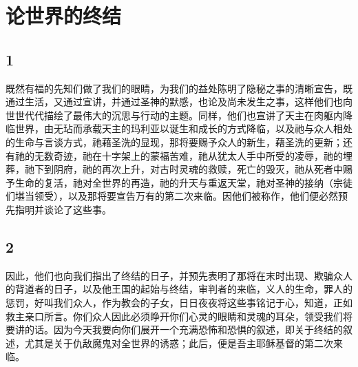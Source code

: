 
\chapter{论世界的终结}


\par


\section{1}

既然有福的先知们做了我们的眼睛，为我们的益处陈明了隐秘之事的清晰宣告，既通过生活，又通过宣讲，并通过圣神的默感，也论及尚未发生之事，这样他们也向世世代代描绘了最伟大的沉思与行动的主题。同样，他们也宣讲了天主在肉躯内降临世界，由无玷而承载天主的玛利亚以诞生和成长的方式降临，以及祂与众人相处的生命与言谈方式，祂藉圣洗的显现，那将要赐予众人的新生，藉圣洗的更新；还有祂的无数奇迹，祂在十字架上的蒙福苦难，祂从犹太人手中所受的凌辱，祂的埋葬，祂下到阴府，祂的再次上升，对古时灵魂的救赎，死亡的毁灭，祂从死者中赐予生命的复活，祂对全世界的再造，祂的升天与重返天堂，祂对圣神的接纳（宗徒们堪当领受），以及那将要宣告万有的第二次来临。因他们被称作，他们便必然预先指明并谈论了这些事。\par


\section{2}

因此，他们也向我们指出了终结的日子，并预先表明了那将在末时出现、欺骗众人的背道者的日子，以及他王国的起始与终结，审判者的来临，义人的生命，罪人的惩罚，好叫我们众人，作为教会的子女，日日夜夜将这些事铭记于心，知道，正如救主亲口所言。你们众人因此必须睁开你们心灵的眼睛和灵魂的耳朵，领受我们将要讲的话。因为今天我要向你们展开一个充满恐怖和恐惧的叙述，即关于终结的叙述，尤其是关于仇敌魔鬼对全世界的诱惑；此后，便是吾主耶稣基督的第二次来临。\par

